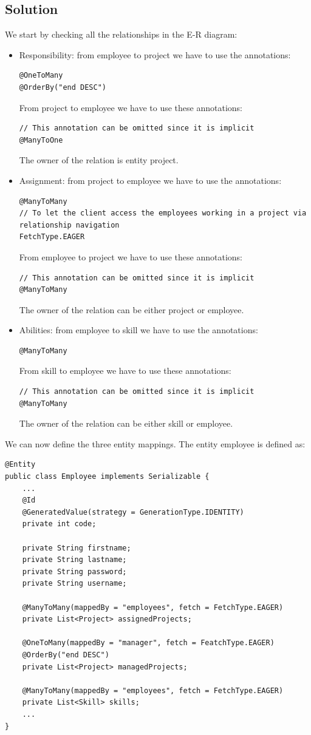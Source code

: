 \subsection*{Solution}
We start by checking all the relationships in the E-R diagram: 
\begin{itemize}
    \item Responsibility: from employee to project we have to use the annotations: 
        \begin{lstlisting}[style=Java]
@OneToMany
@OrderBy("end DESC")
        \end{lstlisting}
        From project to employee we have to use these annotations: 
        \begin{lstlisting}[style=Java]
// This annotation can be omitted since it is implicit
@ManyToOne
        \end{lstlisting}
        The owner of the relation is entity project. 
    \item Assignment: from project to employee we have to use the annotations: 
        \begin{lstlisting}[style=Java]
@ManyToMany
// To let the client access the employees working in a project via relationship navigation
FetchType.EAGER
        \end{lstlisting}
        From employee to project we have to use these annotations: 
        \begin{lstlisting}[style=Java]
// This annotation can be omitted since it is implicit
@ManyToMany
        \end{lstlisting}
        The owner of the relation can be either project or employee. 
    \item Abilities: from employee to skill we have to use the annotations: 
        \begin{lstlisting}[style=Java]
@ManyToMany
        \end{lstlisting}
        From skill to employee we have to use these annotations: 
        \begin{lstlisting}[style=Java]
// This annotation can be omitted since it is implicit
@ManyToMany
        \end{lstlisting}
        The owner of the relation can be either skill or employee. 
\end{itemize}
We can now define the three entity mappings. The entity employee is defined as:  
\begin{lstlisting}[style=Java]
@Entity
public class Employee implements Serializable {
    ...
    @Id
    @GeneratedValue(strategy = GenerationType.IDENTITY)
    private int code;

    private String firstname;
    private String lastname;
    private String password;
    private String username;

    @ManyToMany(mappedBy = "employees", fetch = FetchType.EAGER)
    private List<Project> assignedProjects;

    @OneToMany(mappedBy = "manager", fetch = FeatchType.EAGER)
    @OrderBy("end DESC")
    private List<Project> managedProjects;

    @ManyToMany(mappedBy = "employees", fetch = FetchType.EAGER)
    private List<Skill> skills;
    ...
}
\end{lstlisting}
